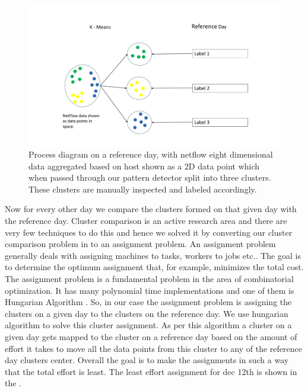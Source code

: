 \begin{figure}[t]
	\centerline{\includegraphics[scale = 0.5]{cluster_comp.pdf}}
	\caption{Process diagram on a reference day, with netflow eight dimensional data aggregated based on host shown as a 2D data point which when passed through our pattern detector split into three clusters. These clusters are manually inspected and labeled accordingly. }%
\end{figure}

 Now for every other day we compare the clusters formed on that given day with the reference day. Cluster comparison is an active research area and there are very few techniques to do this and hence we solved it by converting our cluster comparison problem in to an assignment problem. An assignment problem generally deals with assigning machines to tasks, workers to jobs etc.. The goal is to determine the optimum assignment that, for example, minimizes the total cost. The assignment problem is a fundamental problem in the area of combinatorial optimization. It has many polynomial time implementations and one of them is Hungarian Algorithm \cite{}. So, in our case the assignment problem is assigning the clusters on a given day to the clusters on the reference day. We use hungarian algorithm to solve this cluster assignment. As per this algorithm a cluster on a given day gets mapped to the cluster on a reference day based on the amount of effort it takes to move all the data points from this cluster to any of the reference day clusters center. Overall the goal is to make the assignments in such a way that the total effort is least. The least effort assignment for dec 12th is shown in the .
 

